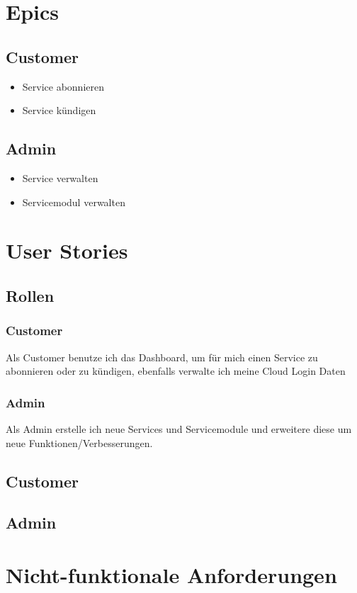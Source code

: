 \documentclass[11pt]{scrartcl}
\begin{document}
\newpage



\newpage

\newpage
\section{Epics}
\subsection{Customer}
\begin{itemize}
  \item Service abonnieren
  \item Service kündigen
\end{itemize}
\subsection{Admin}
\begin{itemize}
  \item Service verwalten
  \item Servicemodul verwalten
\end{itemize}
\section{User Stories}
\subsection{Rollen}
\subsubsection{Customer}
Als Customer benutze ich das Dashboard, um für mich einen Service zu abonnieren oder zu 
kündigen, ebenfalls verwalte ich meine Cloud Login Daten
\subsubsection{Admin}
Als Admin erstelle ich neue Services und Servicemodule und erweitere diese um 
neue Funktionen/Verbesserungen.
\subsection{Customer}




  
 \subsection{Admin}
 
 
 
 

\newpage

\section{Nicht-funktionale Anforderungen}


\end{document}

